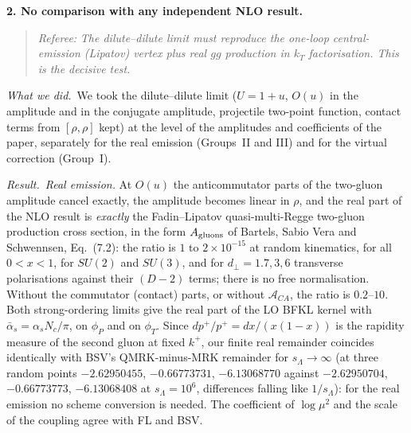 \documentclass[a4paper,11pt]{article}
\newcommand{\point}[1]{\par\medskip\noindent\textbf{#1}\par}
\newcommand{\referee}[1]{\begin{quote}\small\emph{Referee:} \emph{#1}\end{quote}}
\newcommand{\done}{\par\noindent\emph{What we did.}\ }
\newcommand{\result}{\par\noindent\emph{Result.}\ }
\begin{document}
\point{2. No comparison with any independent NLO result.}
\referee{The dilute--dilute limit must reproduce the one-loop central-emission (Lipatov) vertex plus real $gg$ production in $k_T$ factorisation. This is the decisive test.}
\done We took the dilute--dilute limit ($U=1+u$, $O(u)$ in the amplitude and in the conjugate amplitude, projectile two-point function, contact terms from $[\rho,\rho]$ kept) at the level of the amplitudes and coefficients of the paper, separately for the real emission (Groups~II and III) and for the virtual correction (Group~I).
\result \emph{Real emission.} At $O(u)$ the anticommutator parts of the two-gluon amplitude cancel exactly, the amplitude becomes linear in $\rho$, and the real part of the NLO result is \emph{exactly} the Fadin--Lipatov quasi-multi-Regge two-gluon production cross section, in the form $A_{\rm gluons}$ of Bartels, Sabio Vera and Schwennsen, Eq.~(7.2): the ratio is $1$ to $2\times10^{-15}$ at random kinematics, for all $0<x<1$, for $SU(2)$ and $SU(3)$, and for $d_\perp=1.7,3,6$ transverse polarisations against their $(D-2)$ terms; there is no free normalisation. Without the commutator (contact) parts, or without $\mathcal A_{CA}$, the ratio is $0.2$--$10$. Both strong-ordering limits give the real part of the LO BFKL kernel with $\bar\alpha_s=\alpha_sN_c/\pi$, on $\phi_P$ and on $\phi_T$. Since $dp^+/p^+=dx/(x(1-x))$ is the rapidity measure of the second gluon at fixed $k^+$, our finite real remainder coincides identically with BSV's QMRK-minus-MRK remainder for $s_\Lambda\to\infty$ (at three random points $-2.62950455$, $-0.66773731$, $-6.13068770$ against $-2.62950704$, $-0.66773773$, $-6.13068408$ at $s_\Lambda=10^6$, differences falling like $1/s_\Lambda$): for the real emission no scheme conversion is needed. The coefficient of $\log\mu^2$ and the scale of the coupling agree with FL and BSV.
\end{document}

